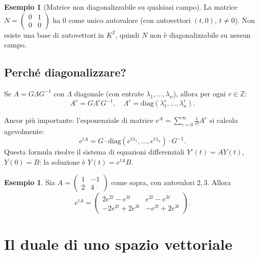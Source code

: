 \documentclass[11pt, a4paper]{book}
\theoremstyle{definition}
\newtheorem{esempio}[definizione]{Esempio}
\theoremstyle{plain}
\theoremstyle{remark}
\newcommand{\Z}{\mathbb{Z}}
\begin{document}
\begin{exbox}
\begin{esempio}[Matrice non diagonalizzabile su qualsiasi campo]
La matrice $N = \begin{pmatrix} 0 & 1 \\ 0 & 0 \end{pmatrix}$ ha $0$ come unico autovalore (con autovettori $(t, 0)$, $t \neq 0$). Non esiste una base di autovettori in $K^2$, quindi $N$ non è diagonalizzabile su nessun campo.
\end{esempio}
\end{exbox}

\subsection{Perché diagonalizzare?}

Se $A = G \Lambda G^{-1}$ con $\Lambda$ diagonale (con entrate $\lambda_1, \ldots, \lambda_n$), allora per ogni $r \in \Z$:
\[
  A^r = G \Lambda^r G^{-1}, \quad \Lambda^r = \mathrm{diag}(\lambda_1^r, \ldots, \lambda_n^r).
\]

Ancor più importante: l'esponenziale di matrice $e^A = \sum_{r=0}^\infty \frac{1}{r!} A^r$ si calcola agevolmente:
\[
  e^{tA} = G \cdot \mathrm{diag}(e^{t\lambda_1}, \ldots, e^{t\lambda_n}) \cdot G^{-1}.
\]
Questa formula risolve il sistema di equazioni differenziali $Y'(t) = A Y(t)$, $Y(0) = B$: la soluzione è $Y(t) = e^{tA} B$.

\begin{exbox}
\begin{esempio}
Sia $A = \begin{pmatrix} 1 & -1 \\ 2 & 4 \end{pmatrix}$ come sopra, con autovalori $2, 3$. Allora
\[
  e^{tA} = \begin{pmatrix} 2e^{2t} - e^{3t} & e^{2t} - e^{3t} \\ -2e^{2t} + 2e^{3t} & -e^{2t} + 2e^{3t} \end{pmatrix}.
\]
\end{esempio}
\end{exbox}

\section{Il duale di uno spazio vettoriale}
\label{sec:duale}
\end{document}

